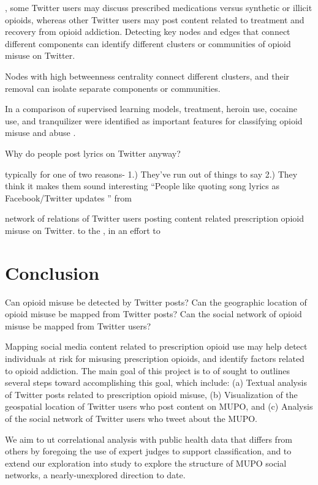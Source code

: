 \documentclass[sigconf]{acmart}
\begin{document}
, some Twitter users may discuss 
prescribed medications versus synthetic or illicit opioids, whereas other 
Twitter users may post content related to treatment and recovery from opioid 
addiction. Detecting key nodes and edges that connect different components 
can identify different clusters or communities of opioid misuse on Twitter.



Nodes with high 
betweenness centrality connect different clusters, and their removal can
isolate separate components or communities. 

In a comparison of supervised 
learning models, treatment, heroin use, cocaine use, and tranquilizer were 
identified as important features for classifying opioid misuse and abuse 
\cite{shiverick17}. 
 
 
Why do people post lyrics on Twitter anyway? 


typically for one of two reasons- 1.) They’ve run out of things to say 
2.) They think it makes them sound interesting
“People like quoting song lyrics as Facebook/Twitter updates ” from 


 network of relations of Twitter users posting 
content related prescription opioid misuse on Twitter. 
to the , in an effort to  

\section{Conclusion}

Can opioid misuse be detected by Twitter posts?
Can the geographic location of opioid misuse be mapped from Twitter posts? 
Can the social network of opioid misuse be mapped from Twitter users?


Mapping social 
media content related to prescription opioid use may help detect individuals 
at risk for misusing prescription opioids, and identify factors related to 
opioid addiction. The main goal of this project is to 
of 
sought to  outlines several steps 
toward accomplishing this goal, which include: (a) Textual analysis of Twitter 
posts related to prescription opioid misuse, (b) Visualization of the 
geospatial location of Twitter users who post content on MUPO, and (c) Analysis 
of the social network of Twitter users who tweet about the MUPO. 


We aim to ut correlational analysis with 
public health data that differs from others by foregoing the use of expert 
judges to support classification, and to extend our exploration into study to 
explore the structure of MUPO social networks, a nearly-unexplored direction 
to date. 
\end{document}
